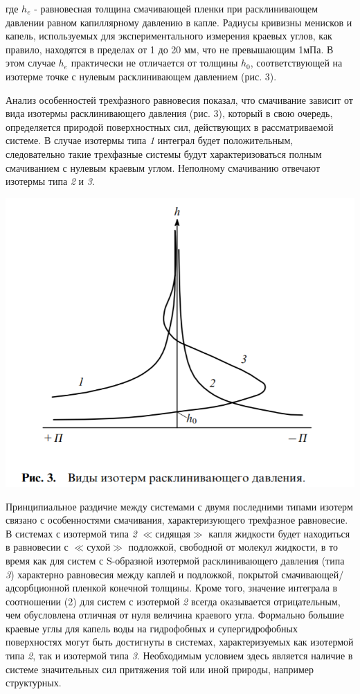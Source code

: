 \documentclass[11pt]{article}
\begin{document}
где $h_e$ - равновесная толщина смачивающей пленки при расклинивающем давлении равном капиллярному давлению в капле. Радиусы кривизны менисков и капель, используемых для экспериментального измерения краевых углов, как правило, находятся в пределах от 1 до 20 мм, что не превышающим 1мПа. В этом случае $h_e$ практически не отличается от толщины $h_0$, соответствующей на изотерме точке с нулевым расклинивающем давлением (рис. 3).

\indent Анализ особенностей трехфазного равновесия показал, что смачивание зависит от вида изотермы расклинивающего давления (рис. 3), который в свою очередь, определяется природой поверхностных сил, действующих в рассматриваемой системе. В случае изотермы типа \textit{1} интеграл будет положительным, следовательно такие трехфазные системы будут характеризоваться полным смачиванием с нулевым краевым углом. Неполному смачиванию отвечают изотермы типа \textit{2} и \textit{3}.

\vspace{0.5cm}

\includegraphics[scale=1]{vpv3.png}

\vspace{0.5cm}

\indent Принципиальное раздичие между системами с двумя последними типами изотерм связано с особенностями смачивания, характеризующего трехфазное равновесие. В системах с изотермой типа \textit{2} $\ll$сидящая$\gg$ капля жидкости будет находиться в равновесии с $\ll$сухой$\gg$ подложкой, свободной от молекул жидкости, в то время как для систем с S-образной изотермой расклинивающего давления (типа \textit{3}) характерно равновесия между каплей и подложкой, покрытой смачивающей/адсорбционной пленкой конечной толщины. Кроме того, значение интеграла в соотношении (2) для систем с изотермой \textit{2} всегда оказывается отрицательным, чем обусловлена отличная от нуля величина краевого угла. Формально большие краевые углы для капель воды на гидрофобных и супергидрофобных поверхностях могут быть достигнуты в системах, характеризуемых как изотермой типа \textit{2}, так и изотермой типа \textit{3}. Необходимым условием здесь является наличие в системе значительных сил притяжения той или иной природы, например структурных.
\end{document}
